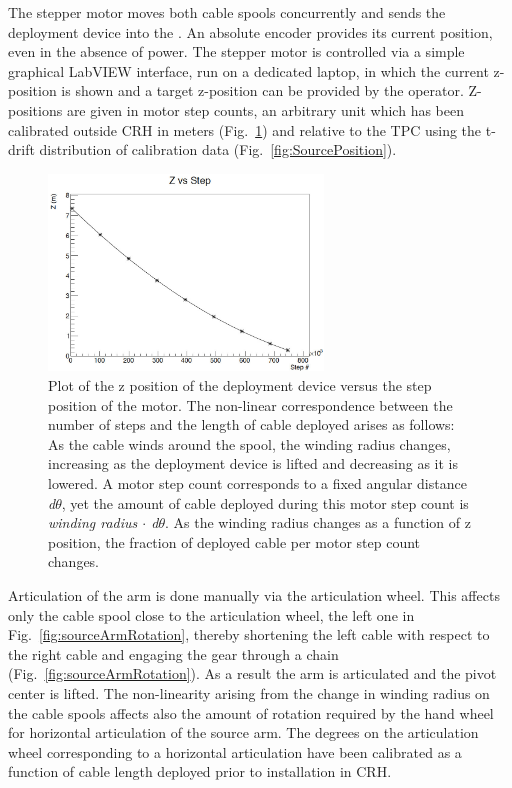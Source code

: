 The stepper motor moves both cable spools concurrently and sends the deployment device into the \lsv. An absolute encoder provides its current position, even in the absence of power. The stepper motor is controlled via a simple graphical LabVIEW interface, run on a dedicated laptop, in which the current z-position is shown and a target z-position can be provided by the operator. Z-positions are given in motor step counts, an arbitrary unit which has been calibrated outside CRH in meters (Fig.~\ref{fig:z_test}) and relative to the TPC using the t-drift distribution of calibration data (Fig.~\ref{fig:SourcePosition}).

\begin{figure}[htbp]
 \centering
 \includegraphics[width=0.65\textwidth]{Figures/Z_positioning_test}
 \caption{Plot of the z position of the deployment device versus the step position of the motor. The non-linear correspondence between the number of steps and the length of cable deployed arises as follows: As the cable winds around the spool, the winding radius changes, increasing as the deployment device is lifted and decreasing as it is lowered. A motor step count corresponds to a fixed angular distance \textit{d$\theta$}, yet the amount of cable deployed during this motor step count is \textit{winding radius $\cdot$ d$\theta$}. As the winding radius changes as a function of z position, the fraction of deployed cable per motor step count changes.}
 \label{fig:z_test}
\end{figure}

\label{sec:Nonlinearity:MotorStepCounts}
Articulation of the arm is done manually via the articulation wheel. This affects only the cable spool close to the articulation wheel, the left one in Fig.~\ref{fig:sourceArmRotation}, thereby shortening the left cable with respect to the right cable and engaging the gear through a chain (Fig.~\ref{fig:sourceArmRotation}). As a result the arm is articulated and the pivot center is lifted. The non-linearity arising from the change in winding radius on the cable spools affects also the amount of rotation required by the hand wheel for horizontal articulation of the source arm.
The degrees on the articulation wheel corresponding to a horizontal articulation have been calibrated as a function of cable length deployed prior to installation in CRH.

